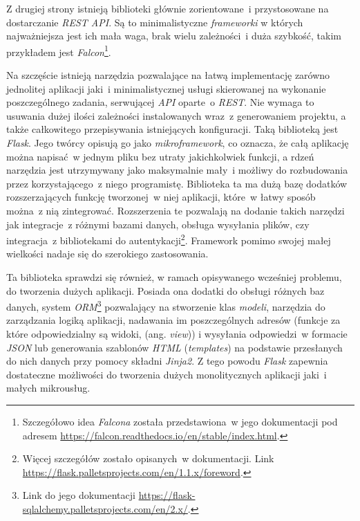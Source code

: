 Z drugiej strony istnieją biblioteki głównie zorientowane~i przystosowane na dostarczanie \textit{REST API}. Są to minimalistyczne \textit{frameworki} w których najważniejsza jest ich mała waga, brak wielu zależności~i duża szybkość, takim przykładem jest \textit{Falcon}\footnote{Szczegółowo idea \textit{Falcona} została przedstawiona~w jego dokumentacji pod adresem \url{https://falcon.readthedocs.io/en/stable/index.html}.}.

Na szczęście istnieją narzędzia pozwalające na łatwą implementację zarówno jednolitej aplikacji jaki~i minimalistycznej usługi skierowanej na wykonanie poszczególnego zadania, serwującej \textit{API} oparte~o \textit{REST}. Nie wymaga to usuwania dużej ilości zależności instalowanych wraz~z generowaniem projektu, a także całkowitego przepisywania istniejących konfiguracji. Taką biblioteką jest \textit{Flask}. Jego twórcy opisują go jako \textit{mikroframework}, co oznacza, że całą aplikację można napisać~w jednym pliku bez utraty jakichkolwiek funkcji, a rdzeń narzędzia jest utrzymywany jako maksymalnie mały~i możliwy do rozbudowania przez korzystającego~z niego programistę\cite{flask}. Biblioteka ta ma dużą bazę dodatków rozszerzających funkcję tworzonej~w niej aplikacji, które~w łatwy sposób można~z nią zintegrować\cite{flask}. Rozszerzenia te pozwalają na dodanie takich narzędzi jak integracje~z różnymi bazami danych, obsługa wysyłania plików, czy integracja~z bibliotekami do autentykacji\footnote{Więcej szczegółów zostało opisanych~w dokumentacji. Link \url{https://flask.palletsprojects.com/en/1.1.x/foreword}.}. Framework pomimo swojej małej wielkości nadaje się do szerokiego zastosowania\cite{flask}.

Ta biblioteka sprawdzi się również, w ramach opisywanego wcześniej problemu, do tworzenia dużych aplikacji. Posiada ona dodatki do obsługi różnych baz danych, system \textit{ORM}\footnote{Link do jego dokumentacji \url{https://flask-sqlalchemy.palletsprojects.com/en/2.x/}.} pozwalający na stworzenie klas \textit{modeli}, narzędzia do zarządzania logiką aplikacji, nadawania im poszczególnych adresów (funkcje za które odpowiedzialny są widoki, (ang. \textit{view})) i wysyłania odpowiedzi~w formacie \textit{JSON} lub generowania szablonów \textit{HTML} (\textit{templates}) na podstawie przesłanych do nich danych przy pomocy składni \textit{Jinja2}\cite{flask}. Z tego powodu \textit{Flask} zapewnia dostateczne możliwości do tworzenia dużych monolitycznych aplikacji jaki~i małych mikrousług.

